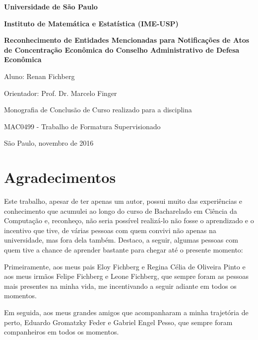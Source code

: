 \documentclass[11pt]{report}
\begin{document}
\begin{center}
  \thispagestyle{empty}
  {\LARGE \textbf{Universidade de São Paulo}}
  \vspace*{10px}

  {\LARGE \textbf{Instituto de Matemática e Estatística (IME-USP)}}
  \vspace*{150px}

  {\Large \textbf{Reconhecimento de Entidades Mencionadas para Notificações de Atos de Concentração Econômica do Conselho Administrativo de Defesa Econômica}}
  \vspace*{100px}

  {\Large Aluno: Renan Fichberg}

  \vspace*{1px}
  {\Large Orientador: Prof. Dr. Marcelo Finger}

  \vspace*{150px}
  {\large Monografia de Conclusão de Curso realizado para a disciplina}

  \vspace*{1px}
  {\large MAC0499 - Trabalho de Formatura Supervisionado}

  \vspace*{100px}
  {\large São Paulo, novembro de 2016}
\end{center}

\pagebreak
\thispagestyle{empty}
\chapter*{Agradecimentos}

\indent\indent Este trabalho, apesar de ter apenas um autor, possui muito das experiências e conhecimento que acumulei ao longo
do curso de Bacharelado em Ciência da Computação e, reconheço, não seria possível realizá-lo não fosse o aprendizado e o incentivo que tive, de várias
pessoas com quem convivi não apenas na universidade, mas fora dela também. Destaco, a seguir, algumas pessoas com quem tive a chance de aprender
bastante para chegar até o presente momento:

Primeiramente, aos meus pais Eloy Fichberg e Regina Célia de Oliveira Pinto e aos meus irmãos Felipe Fichberg e Leone Fichberg, que sempre foram
as pessoas mais presentes na minha vida, me incentivando a seguir adiante em todos os momentos.

Em seguida, aos meus grandes amigos que acompanharam a minha trajetória de perto, Eduardo Gromatzky Feder e Gabriel Engel Pesso, que sempre foram companheiros
em todos os momentos.
\end{document}
